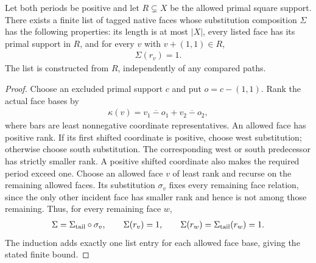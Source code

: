 \begin{lemma}
    \label{lem:peps_dual_finite_face_elimination}
    \leanok
    Let both periods be positive and let $R\subsetneq X$ be the allowed
    primal square support. There exists a finite list of tagged native faces
    whose substitution composition $\Sigma$ has the following properties:
    its length is at most $|X|$, every listed face has its primal support in $R$,
    and for every $v$ with $v+(1,1)\in R$,
    \begin{align}
        \Sigma(r_v)=1.
        \label{eq:peps_dual_finite_face_elimination}
    \end{align}
    The list is constructed from $R$, independently of any compared paths.
\end{lemma}
\begin{proof}\leanok
    Choose an excluded primal support $c$ and put $o=c-(1,1)$. Rank the
    actual face bases by
    \begin{align}
        \kappa(v)=\overline{v_1-o_1}+\overline{v_2-o_2},
        \label{eq:peps_dual_face_elimination_rank}
    \end{align}
    where bars are least nonnegative coordinate representatives.
    An allowed face has positive rank. If its first shifted coordinate is
    positive, choose west substitution; otherwise choose south substitution.
    The corresponding west or south predecessor has strictly smaller rank.
    A positive shifted coordinate also makes the required period exceed one.
    Choose an allowed face $v$ of least rank and recurse on the remaining
    allowed faces. Its substitution $\sigma_v$ fixes every remaining face
    relation, since the only other incident face has smaller rank and
    hence is not among those remaining. Thus, for every remaining face $w$,
    \begin{align}
        \Sigma=\Sigma_{\rm tail}\circ\sigma_v,\qquad
        \Sigma(r_v)=1,\qquad
        \Sigma(r_w)=\Sigma_{\rm tail}(r_w)=1.
        \label{eq:peps_dual_face_elimination_induction}
    \end{align}
    The induction adds exactly one list entry for each allowed face base,
    giving the stated finite bound.
\end{proof}

